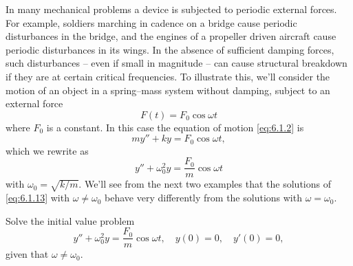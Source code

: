 
\noindent
In many mechanical problems a device is subjected to periodic external forces. For example, soldiers
marching in cadence on a bridge cause periodic disturbances in the bridge, and the engines of a
propeller driven aircraft cause periodic disturbances in its wings. In the absence of sufficient
damping forces, such disturbances -- even if small in magnitude -- can cause structural breakdown if
they are at certain critical frequencies. To illustrate this, we'll consider the motion of an object
in a spring--mass system without damping, subject to an external force
\[
  F(t)=F_{0}\cos\omega t
\]
where $F_{0}$ is a constant. In this case the equation of motion \eqref{eq:6.1.2} is
\[
  my''+ky=F_{0}\cos\omega t,
\]
which we rewrite as
\begin{equation}
  \label{eq:6.1.13}y''+\omega_{0}^{2}y=\frac{F_{0}}{m}\cos\omega t
\end{equation}
with $\omega_{0}=\sqrt{k/m}$. We'll see from the next two examples that the solutions of
\eqref{eq:6.1.13} with $\omega\ne\omega_{0}$ behave very differently from the solutions with
$\omega=\omega_{0}$.

\begin{example}
  \label{example:6.1.4}\rm Solve the initial value problem
  \begin{equation}
    \label{eq:6.1.14}y''+\omega_{0}^{2}y=\frac{F_{0}}{m}\cos\omega t,\quad y(0)=0,\quad y'(0)=0,
  \end{equation}
  given that $\omega\ne\omega_{0}$.
\end{example}

